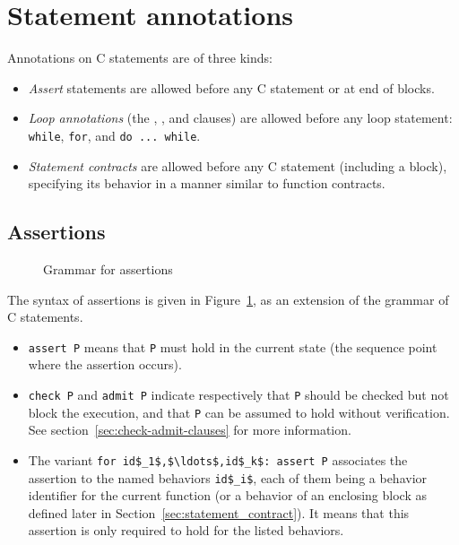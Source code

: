 

\section{Statement annotations}

Annotations on C statements are of three kinds:
\begin{itemize}
\item \emph{Assert} statements are allowed before any C statement or
  at end of blocks.
\item{}
  \emph{Loop annotations} (the \invariant, \assigns, and \variant clauses) are allowed
  before any loop statement: \lstinline|while|, \lstinline|for|, and
  \lstinline|do ... while|.
\item{}
  \emph{Statement contracts} are allowed before any C statement (including a block), specifying
  its behavior in a manner similar to function contracts.
\end{itemize}

\subsection{Assertions}
\label{sec:assertions}
\begin{figure}[htp]
  \begin{cadre}
    
  \end{cadre}
  \caption{Grammar for assertions}
  \label{fig:gram:assertions}
\end{figure}

The syntax of assertions is given in Figure~\ref{fig:gram:assertions},
as an extension of the grammar of C statements.

\begin{itemize}
\item
  \lstinline|assert P|  means that \lstinline|P| must hold in the current state
  (the sequence point where the assertion occurs).
\item \lstinline|check P| and \lstinline|admit P| indicate respectively that
\lstinline|P| should be checked but not block the execution, and that \lstinline|P|
can be assumed to hold without verification. See section~\ref{sec:check-admit-clauses}
for more information.
\item The variant \lstinline|for id$_1$,$\ldots$,id$_k$: assert P|
  associates the assertion to the named behaviors \lstinline|id$_i$|, each
  of them being a behavior identifier for the current function (or a
  behavior of an enclosing block as defined later in
  Section~\ref{sec:statement_contract}).  It means that this assertion
  is only required to hold for the listed behaviors.
\end{itemize}

